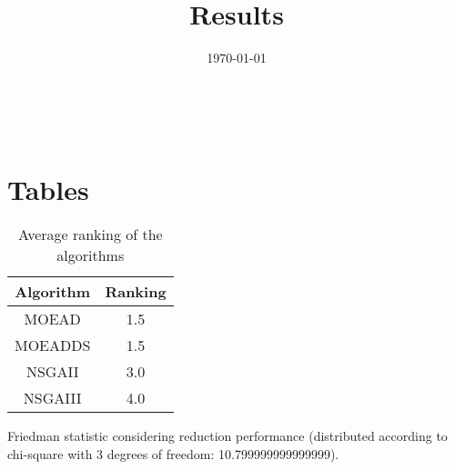 \documentclass{article}
\title{Results}
\author{}
\date{\today}
\begin{document}
\oddsidemargin 0in \topmargin 0in\maketitle
\
\section{Tables}
\begin{table}[!htp]
\centering
\caption{Average ranking of the algorithms}
\begin{tabular}{c|c}
Algorithm&Ranking\\
\hline
MOEAD&1.5\\
MOEADDS&1.5\\
NSGAII&3.0\\
NSGAIII&4.0\\
\end{tabular}
\end{table}


Friedman statistic considering reduction performance (distributed according to chi-square with 3 degrees of freedom: 10.799999999999999).
\end{document}
